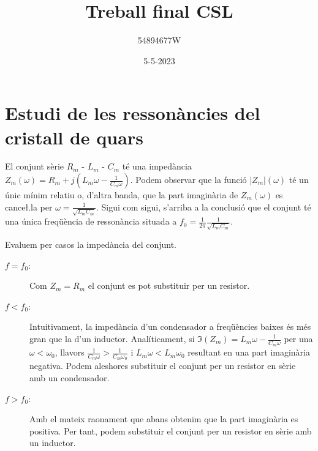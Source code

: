 \documentclass[catalan, a4paper, nobib]{tufte-handout}
\author{54894677W}
\title{Treball final CSL}
\date{5-5-2023}
\begin{document}
\maketitle

\section{Estudi de les ressonàncies del cristall de quars}

 El conjunt sèrie $R_m$ - $L_m$ - $C_m$ té una impedància $Z_m(\omega) = R_m + j(L_m \omega - \frac{1}{C_m \omega})$. Podem observar que la funció $|Z_m|(\omega)$ té un únic mínim relatiu o, d'altra banda, que la part imaginària de $Z_m(\omega)$ es cance\l.la per $\omega = \frac{1}{\sqrt{L_m C_m}}$. Sigui com sigui, s'arriba a la conclusió que el conjunt té una única freqüència de ressonància situada a $f_0 = \frac{1}{2\pi} \frac{1}{\sqrt{L_m C_m}}$.

 Evaluem per casos la impedància del conjunt.

\begin{description}
  \item[$f = f_0$:] Com $Z_m = R_m$ el conjunt es pot substituir per un resistor.
  \item[$f < f_0$:] Intuitivament, la impedància d'un condensador a freqüències baixes és més gran que la d'un inductor. Analíticament, si $\Im(Z_m) = L_m \omega - \frac{1}{C_m \omega}$ per una $\omega < \omega_0$, llavors $\frac{1}{C_m \omega} > \frac{1}{C_m \omega_0}$ i $L_m \omega < L_m \omega_0$ resultant en una part imaginària negativa. Podem aleshores substituir el conjunt per un resistor en sèrie amb un condensador. 
  \item[$f > f_0$:] Amb el mateix raonament que abans obtenim que la part imaginària es positiva. Per tant, podem substituir el conjunt per un resistor en sèrie amb un inductor.
\end{description}
\end{document}
